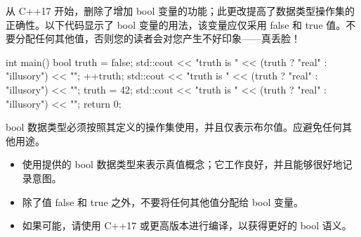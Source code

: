 从 C++17 开始，删除了增加 bool 变量的功能；此更改提高了数据类型操作集的正确性。以下代码显示了 bool 变量的用法，该变量应仅采用 false 和 true 值。不要分配任何其他值，否则您的读者会对您产生不好印象——真丢脸！


\begin{cpp}
int main() {
  bool truth = false;
  std::cout << "truth is " << (truth ? "real" : "illusory") << "\n";
  ++truth;
  std::cout << "truth is " << (truth ? "real" : "illusory") << "\n";
  truth = 42;
  std::cout << "truth is " << (truth ? "real" : "illusory") << "\n";
  return 0;
}
\end{cpp}

bool 数据类型必须按照其定义的操作集使用，并且仅表示布尔值。应避免任何其他用途。


\begin{itemize}
\item
使用提供的 bool 数据类型来表示真值概念；它工作良好，并且能够很好地记录意图。

\item
除了值 false 和 true 之外，不要将任何其他值分配给 bool 变量。

\item
如果可能，请使用 C++17 或更高版本进行编译，以获得更好的 bool 语义。
\end{itemize}

















